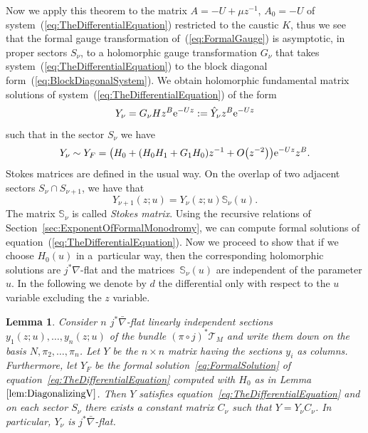 \documentclass[10pt,a4paper]{amsart}
\numberwithin{equation}{section}
\newtheorem{Lemma}[Theorem]{Lemma}
\begin{document}
Now we apply this theorem to the matrix $A=-U+\mu z^{-1}$, $A_{0}=-U$ of system~(\ref{eq:TheDifferentialEquation}) restricted to the caustic $K$, thus we see that the formal gauge transformation of~(\ref{eq:FormalGauge}) is asymptotic, in proper sectors $S_{\nu}$, to a holomorphic gauge transformation $G_{\nu}$ that takes system~(\ref{eq:TheDifferentialEquation}) to the block diagonal form~(\ref{eq:BlockDiagonalSystem}). We obtain holomorphic fundamental matrix solutions of system~(\ref{eq:TheDifferentialEquation}) of the form
\begin{equation}
 \label{eq:CanonicalHolomorphicSolution}
 Y_{\nu}=G_{\nu}Hz^{B}{\rm e}^{-Uz}:=\hat{Y}_{\nu}z^{B}{\rm e}^{-Uz}
\end{equation}
such that in the sector $S_{\nu}$ we have
\begin{equation}
 \label{eq:AsymptoticsOfHolomorphic}
 Y_{\nu}\sim Y_{F}=\bigl(H_{0}+(H_{0}H_{1}+G_{1}H_{0})z^{-1}+O\bigl(z^{-2}\bigr)\bigr){\rm e}^{-Uz}z^{B}.
\end{equation}
Stokes matrices are defined in the usual way. On the overlap of two adjacent sectors $S_{\nu}\cap S_{\nu+1}$, we have that
\begin{equation*}
 Y_{\nu+1}(z;u)=Y_{\nu}(z;u)\mathbb{S}_{\nu}(u).
\end{equation*}
The matrix $\mathbb{S}_{\nu}$ is called \emph{Stokes matrix}. Using the recursive relations of Section~\ref{sec:ExponentOfFormalMonodromy}, we can compute formal solutions of equation~(\ref{eq:TheDifferentialEquation}). Now we proceed to show that if we choose $H_{0}(u)$ in a~particular way, then the corresponding holomorphic solutions are $j^{*}\nabla$-flat and the matrices~$\mathbb{S}_{\nu}(u)$ are independent of the parameter $u$. In the following we denote by $d$ the differential only with respect to the $u$ variable excluding the $z$ variable.
\begin{Lemma}
 Consider $n$ $j^{*}\bar{\nabla}$-flat linearly independent sections $y_{1}(z;u),\dots,y_{n}(z;u)$ of the bundle $(\pi\circ j)^{*}\mathcal{T}_{M}$ and write them down on the basis $N,\pi_{2},\dots,\pi_{n}$. Let $Y$ be the $n\times n$ matrix having the sections $y_{i}$ as columns. Furthermore, let $Y_{F}$ be the formal solution~\eqref{eq:FormalSolution} of equation~\eqref{eq:TheDifferentialEquation} computed with $H_{0}$ as in Lemma~$\ref{lem:DiagonalizingV}$. Then $Y$ satisfies equation~\eqref{eq:TheDifferentialEquation} and on each sector $S_{\nu}$ there exists a constant matrix $C_{\nu}$ such that $Y=Y_{\nu}C_{\nu}$. In particular, $Y_{\nu}$ is $j^{*}\bar{\nabla}$-flat.
\end{Lemma}
\end{document}
